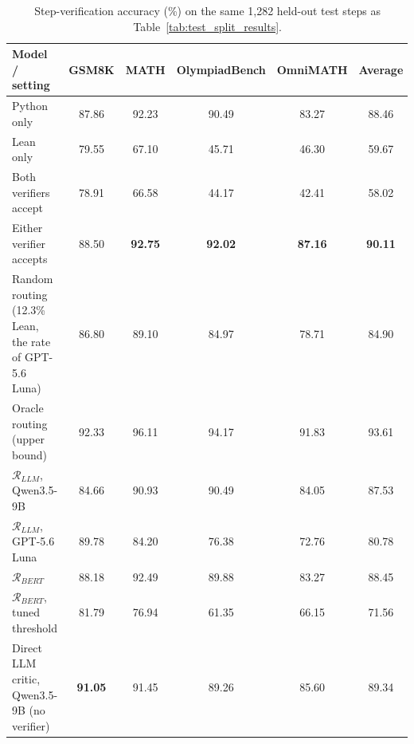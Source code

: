 \begin{table}[ht]
\centering
\begin{tabular}{lccccc}
\hline
\textbf{Model / setting} & \textbf{GSM8K} & \textbf{MATH} & \textbf{OlympiadBench} & \textbf{OmniMATH} & \textbf{Average} \\
\hline
Python only & 87.86 & 92.23 & 90.49 & 83.27 & 88.46 \\
Lean only & 79.55 & 67.10 & 45.71 & 46.30 & 59.67 \\
Both verifiers accept & 78.91 & 66.58 & 44.17 & 42.41 & 58.02 \\
Either verifier accepts & 88.50 & \textbf{92.75} & \textbf{92.02} & \textbf{87.16} & \textbf{90.11} \\
Random routing (12.3\% Lean, the rate of GPT-5.6 Luna) & 86.80 & 89.10 & 84.97 & 78.71 & 84.90 \\
Oracle routing (upper bound) & 92.33 & 96.11 & 94.17 & 91.83 & 93.61 \\
\midrule
$\mathcal{R}_{LLM}$, Qwen3.5-9B & 84.66 & 90.93 & 90.49 & 84.05 & 87.53 \\
$\mathcal{R}_{LLM}$, GPT-5.6 Luna & 89.78 & 84.20 & 76.38 & 72.76 & 80.78 \\
$\mathcal{R}_{BERT}$ & 88.18 & 92.49 & 89.88 & 83.27 & 88.45 \\
$\mathcal{R}_{BERT}$, tuned threshold & 81.79 & 76.94 & 61.35 & 66.15 & 71.56 \\
Direct LLM critic, Qwen3.5-9B (no verifier) & \textbf{91.05} & 91.45 & 89.26 & 85.60 & 89.34 \\
\hline
\end{tabular}
\caption{Step-verification accuracy (\%) on the same 1,282 held-out test steps as Table~\ref{tab:test_split_results}.}
\label{tab:test_split_accuracy}
\end{table}
